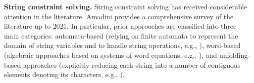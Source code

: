 

{\bf String constraint solving.} 
String constraint solving has received considerable attention in the literature. Amadini \cite{Amadini23} provides a comprehensive survey of the literature up to 2021. In particular, %
prior approaches %
are classified into three main categories: automata-based (relying on finite automata to represent the domain of string variables
and to handle string operations, e.g., \cite{Abdulla14,HJLRV18,CCH+18,Vijay-length,LB16,BerzishKMMDNG20,ChenCHHLS24}), word-based (algebraic approaches based on systems of word equations, e.g., \cite{cvc4,BarbosaBBKLMMMN22,Z3,Z3str2,Z3str3,Z3str4,TCJ16,S3,BerzishKMMDNG20,ChenCHHLS24}), 
and unfolding-based approaches (explicitly reducing each string into a number of contiguous elements denoting its
characters, e.g., \cite{SFPS17,KGAGHE13,SAHMMS10,LG13,AGS18,DEKMNP19}). 

